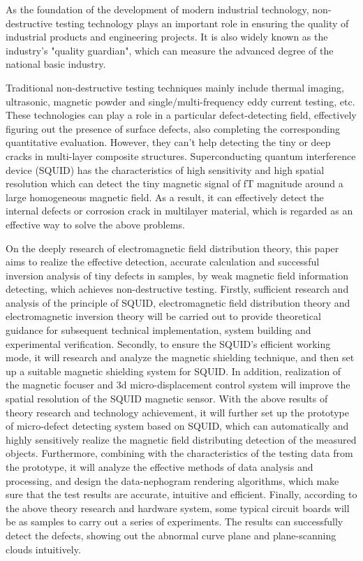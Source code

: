 \documentclass[a4paper,12pt，twoside]{ctexart}
\begin{document}
		{\fontsize{12pt}{15pt}\selectfont
		
		As the foundation of the development of modern industrial technology, non-destructive testing technology plays an important role in ensuring the quality of industrial products and engineering projects. It is also widely known as the industry's "quality guardian", which can measure the advanced degree of the national basic industry.\par
		Traditional non-destructive testing techniques mainly include thermal imaging, ultrasonic, magnetic powder and single/multi-frequency eddy current testing, etc. These technologies can play a role in a particular defect-detecting field, effectively figuring out the presence of surface defects, also completing the corresponding quantitative evaluation. However, they can’t help detecting the tiny or deep cracks in multi-layer composite structures. Superconducting quantum interference device (SQUID) has the characteristics of high sensitivity and high spatial resolution which can detect the tiny magnetic signal of fT magnitude around a large homogeneous magnetic field. As a result, it can effectively detect the internal defects or corrosion crack in multilayer material, which is regarded as an effective way to solve the above problems.\par
		On the deeply research of electromagnetic field distribution theory, this paper aims to realize the effective detection, accurate calculation and successful inversion analysis of tiny defects in samples, by weak magnetic field information detecting, which achieves non-destructive testing. Firstly, sufficient research and analysis of the principle of SQUID, electromagnetic field distribution theory and electromagnetic inversion theory will be carried out to provide theoretical guidance for subsequent technical implementation, system building and experimental verification. Secondly, to ensure the SQUID's efficient working mode, it will research and analyze the magnetic shielding technique, and then set up a suitable magnetic shielding system for SQUID. In addition, realization of the magnetic focuser and 3d micro-displacement control system will improve the spatial resolution of the SQUID magnetic sensor. With the above results of theory research and technology achievement, it will further set up the prototype of micro-defect detecting system based on SQUID, which can automatically and highly sensitively realize the magnetic field distributing detection of the measured objects. Furthermore, combining with the characteristics of the testing data from the prototype, it will analyze the effective methods of data analysis and processing, and design the data-nephogram rendering algorithms, which make sure that the test results are accurate, intuitive and efficient. Finally, according to the above theory research and hardware system, some typical circuit boards will be as samples to carry out a series of experiments. The results can successfully detect the defects, showing out the abnormal curve plane and plane-scanning clouds intuitively. \par
}
\end{document}
